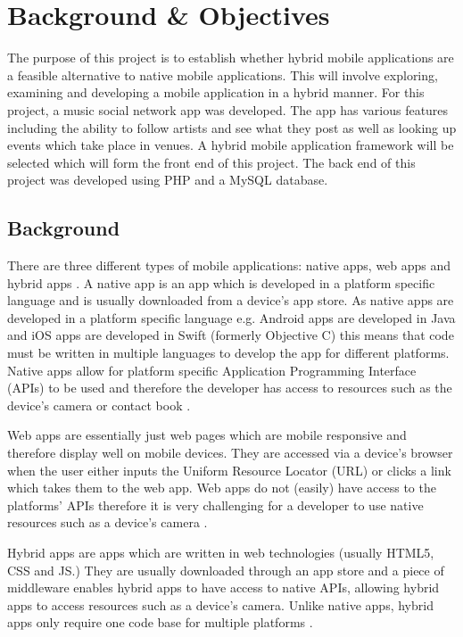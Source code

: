 \chapter{Background \& Objectives}

The purpose of this project is to establish whether hybrid mobile applications are a feasible alternative to native mobile applications. This will involve exploring, examining and developing a mobile application in a hybrid manner. For this project, a music social network app was developed. The app has various features including the ability to follow artists and see what they post as well as looking up events which take place in venues. A hybrid mobile application framework will be selected which will form the front end of this project. The back end of this project was developed using PHP and a MySQL database.

\section{Background}
There are three different types of mobile applications: native apps, web apps and  hybrid apps \cite{BAB} \cite{IIA} \cite{PTA}. A native app is an app which is developed in a platform specific language and is usually downloaded from a device's app store. As native apps are developed in a platform specific language e.g. Android apps are developed in Java \cite{AD} and iOS apps are developed in Swift (formerly Objective C) \cite{ID} this means that code must be written in multiple languages to develop the app for different platforms. Native apps allow for platform specific Application Programming Interface (APIs) to be used and therefore the developer has access to resources such as the device's camera or contact book \cite{MAC} \cite{drupal}.

Web apps are essentially just web pages which are mobile responsive and therefore display well on mobile devices. They are accessed via a device's browser when the user either inputs the Uniform Resource Locator (URL) or clicks a link which takes them to the web app. Web apps do not (easily) have access to the platforms' APIs therefore it is very challenging for a developer to use native resources such as a device's camera \cite{MAC} \cite{BAB}.

Hybrid apps are apps which are written in web technologies (usually HTML5, CSS and JS.) They are usually downloaded through an app store and a piece of middleware enables hybrid apps to have access to native APIs, allowing hybrid apps to access resources such as a device's camera. Unlike native apps, hybrid apps only require one code base for multiple platforms\cite{MAC} \cite{SF}.


